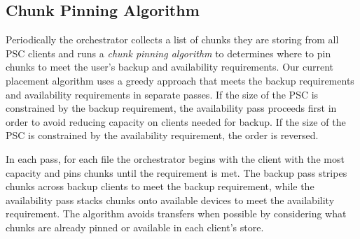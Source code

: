 \subsection{Chunk Pinning Algorithm}
\label{sec-design-algorithm}

Periodically the orchestrator collects a list of chunks they are storing from
all PSC clients and runs a \textit{chunk pinning algorithm} to determines
where to pin chunks to meet the user's backup and availability requirements.
Our current placement algorithm uses a greedy approach that meets the backup
requirements and availability requirements in separate passes. If the size of
the PSC is constrained by the backup requirement, the availability pass
proceeds first in order to avoid reducing capacity on clients needed for
backup. If the size of the PSC is constrained by the availability
requirement, the order is reversed.

In each pass, for each file the orchestrator begins with the client with the
most capacity and pins chunks until the requirement is met. The backup pass
stripes chunks across backup clients to meet the backup requirement, while the
availability pass stacks chunks onto available devices to meet the availability
requirement. The algorithm avoids transfers when possible by considering what
chunks are already pinned or available in each client's store.

